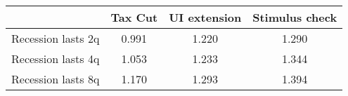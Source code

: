 \begin{tabular}{@{}lccc@{}}
\toprule
& Tax Cut    & UI extension    & Stimulus check    \\  \midrule
Recession lasts 2q &0.991  & 1.220  & 1.290     \\
Recession lasts 4q &1.053  & 1.233  & 1.344     \\
Recession lasts 8q &1.170  & 1.293  & 1.394     \\
\end{tabular}
